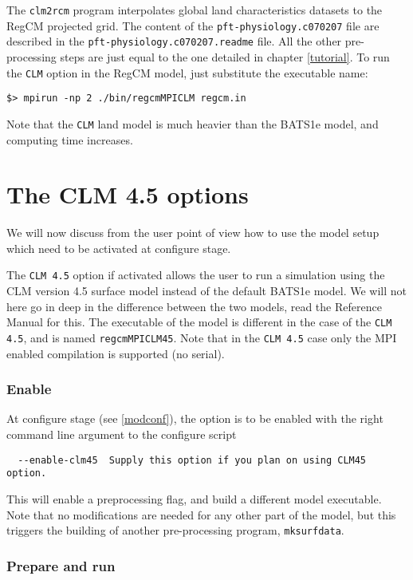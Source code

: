 The \verb=clm2rcm= program interpolates global land characteristics datasets
to the RegCM projected grid. The content of the \verb=pft-physiology.c070207=
file are described in the \verb=pft-physiology.c070207.readme= file.
All the other pre-processing steps are just equal to the one detailed in
chapter \ref{tutorial}. To run the \verb=CLM= option in the RegCM model, just
substitute the executable name:

\begin{Verbatim}
$> mpirun -np 2 ./bin/regcmMPICLM regcm.in
\end{Verbatim}

Note that the \verb=CLM= land model is much heavier than the BATS1e model, and
computing time increases.

\section{The CLM 4.5 options}
\label{clm45}

We will now discuss from the user point of view how to use the model
setup which need to be activated at configure stage.

The \verb=CLM 4.5= option if activated allows the user to run a simulation using
the CLM version 4.5 surface model instead of the default BATS1e model.
We will not here go in deep in the difference between the two models, read
the Reference Manual for this.
The executable of the model is different in the case of the \verb=CLM 4.5=,
and is named \verb=regcmMPICLM45=.
Note that in the \verb=CLM 4.5= case only the MPI enabled compilation is
supported (no serial).

\subsubsection{Enable}

At configure stage (see \ref{modconf}), the option is to be enabled with the
right command line argument to the configure script

\begin{Verbatim}
  --enable-clm45  Supply this option if you plan on using CLM45 option.
\end{Verbatim}

This will enable a preprocessing flag, and build a different model executable.
Note that no modifications are needed for any other part of the model, but
this triggers the building of another pre-processing program, \verb=mksurfdata=.

\subsubsection{Prepare and run}
\label{clm45run}


